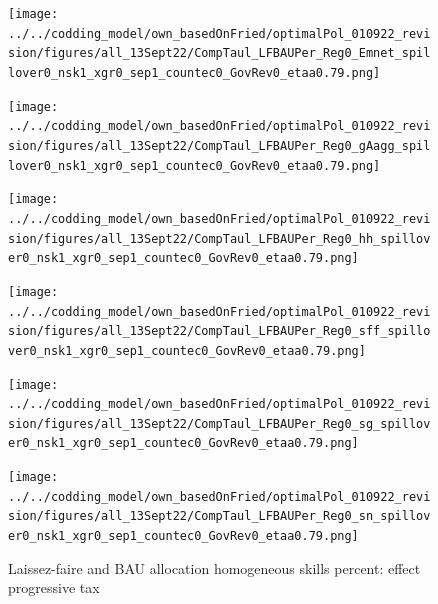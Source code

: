 \begin{figure}[h!!]
	\centering
	\caption{Laissez-faire and BAU allocation homogeneous skills percent: effect progressive tax }\label{fig:LF_BAU_nsk1_per}
	\begin{minipage}[]{0.32\textwidth}
		\texttt{[image: ../../codding\_model/own\_basedOnFried/optimalPol\_010922\_revision/figures/all\_13Sept22/CompTaul\_LFBAUPer\_Reg0\_Emnet\_spillover0\_nsk1\_xgr0\_sep1\_countec0\_GovRev0\_etaa0.79.png]}
	\end{minipage}	
	\begin{minipage}[]{0.32\textwidth}
		\texttt{[image: ../../codding\_model/own\_basedOnFried/optimalPol\_010922\_revision/figures/all\_13Sept22/CompTaul\_LFBAUPer\_Reg0\_gAagg\_spillover0\_nsk1\_xgr0\_sep1\_countec0\_GovRev0\_etaa0.79.png]}
	\end{minipage}	
	\begin{minipage}[]{0.32\textwidth}
		\texttt{[image: ../../codding\_model/own\_basedOnFried/optimalPol\_010922\_revision/figures/all\_13Sept22/CompTaul\_LFBAUPer\_Reg0\_hh\_spillover0\_nsk1\_xgr0\_sep1\_countec0\_GovRev0\_etaa0.79.png]}
	\end{minipage}	
	\begin{minipage}[]{0.32\textwidth}
		\texttt{[image: ../../codding\_model/own\_basedOnFried/optimalPol\_010922\_revision/figures/all\_13Sept22/CompTaul\_LFBAUPer\_Reg0\_sff\_spillover0\_nsk1\_xgr0\_sep1\_countec0\_GovRev0\_etaa0.79.png]}
	\end{minipage}		
	\begin{minipage}[]{0.32\textwidth}
		\texttt{[image: ../../codding\_model/own\_basedOnFried/optimalPol\_010922\_revision/figures/all\_13Sept22/CompTaul\_LFBAUPer\_Reg0\_sg\_spillover0\_nsk1\_xgr0\_sep1\_countec0\_GovRev0\_etaa0.79.png]}
	\end{minipage}	
	\begin{minipage}[]{0.32\textwidth}
		\texttt{[image: ../../codding\_model/own\_basedOnFried/optimalPol\_010922\_revision/figures/all\_13Sept22/CompTaul\_LFBAUPer\_Reg0\_sn\_spillover0\_nsk1\_xgr0\_sep1\_countec0\_GovRev0\_etaa0.79.png]}

\end{minipage}
\end{figure}
